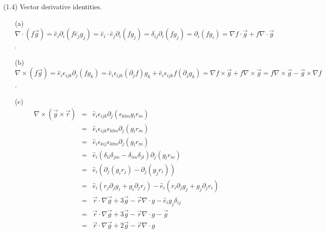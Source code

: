 \documentclass{article}
\begin{document}
\begin{enumerate}
\item[(1.4)] Vector derivative identities.
\begin{enumerate}
\item[(a)] $\nabla\cdot(f\vec{g}) = \hat{e}_i\partial_i(f\hat{e}_jg_j) =
\hat{e}_i\cdot\hat{e}_j\partial_i(fg_j) = \delta_{ij}\partial_i(fg_j) =
\partial_i(fg_i) = \nabla f \cdot\vec{g} + f\nabla\cdot\vec{g}$.

\item[(b)] $\nabla\times(f\vec{g}) = \hat{e}_i\epsilon_{ijk}\partial_j(fg_k)
= \hat{e}_i\epsilon_{ijk}(\partial_j f)g_k + \hat{e}_i\epsilon_{ijk}f
(\partial_jg_k) = \nabla f\times \vec{g} + f\nabla\times\vec{g} = 
f\nabla\times\vec{g} - \vec{g}\times\nabla f$.

\item[(c)] 
\begin{eqnarray*}
\nabla\times(\vec{g}\times\vec{r}) &=& 
    \hat{e}_i\epsilon_{ijk}\partial_j(\epsilon_{klm}g_lr_m) \\
 &=& \hat{e}_i\epsilon_{ijk}\epsilon_{klm}\partial_j(g_lr_m) \\
 &=& \hat{e}_i\epsilon_{kij}\epsilon_{klm}\partial_j(g_lr_m) \\
 &=& \hat{e}_i(\delta_{il}\delta_{jm} - \delta_{im}\delta_{jl})
     \partial_j(g_lr_m) \\
 &=& \hat{e}_i(\partial_j(g_ir_j) - \partial_j(g_jr_i)) \\
 &=& \hat{e}_i(r_j\partial_j g_i + g_i\partial_jr_j) -
     \hat{e}_i(r_i\partial_jg_j + g_j\partial_jr_i) \\
 &=& \vec{r}\cdot\nabla\vec{g} + 3\vec{g} - \vec{r}\nabla\cdot{g} 
     - \hat{e}_ig_j\delta_{ij} \\
 &=& \vec{r}\cdot\nabla\vec{g} + 3\vec{g} - \vec{r}\nabla\cdot{g} - \vec{g} \\
 &=& \vec{r}\cdot\nabla\vec{g} + 2\vec{g} - \vec{r}\nabla\cdot{g}
\end{eqnarray*}

\end{enumerate}
\end{enumerate}
\end{document}

